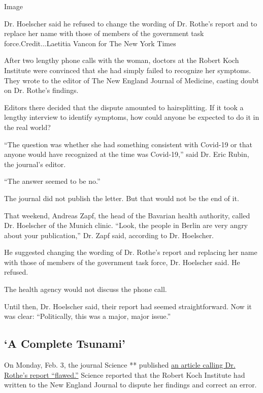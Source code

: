 Image

Dr. Hoelscher said he refused to change the wording of Dr. Rothe's
report and to replace her name with those of members of the government
task force.Credit...Laetitia Vancon for The New York Times

After two lengthy phone calls with the woman, doctors at the Robert Koch
Institute were convinced that she had simply failed to recognize her
symptoms. They wrote to the editor of The New England Journal of
Medicine, casting doubt on Dr. Rothe's findings.

Editors there decided that the dispute amounted to hairsplitting. If it
took a lengthy interview to identify symptoms, how could anyone be
expected to do it in the real world?

``The question was whether she had something consistent with Covid-19 or
that anyone would have recognized at the time was Covid-19,'' said Dr.
Eric Rubin, the journal's editor.

``The answer seemed to be no.''

The journal did not publish the letter. But that would not be the end of
it.

That weekend, Andreas Zapf, the head of the Bavarian health authority,
called Dr. Hoelscher of the Munich clinic. ``Look, the people in Berlin
are very angry about your publication,'' Dr. Zapf said, according to Dr.
Hoelscher.

He suggested changing the wording of Dr. Rothe's report and replacing
her name with those of members of the government task force, Dr.
Hoelscher said. He refused.

The health agency would not discuss the phone call.

Until then, Dr. Hoelscher said, their report had seemed straightforward.
Now it was clear: ``Politically, this was a major, major issue.''

\hypertarget{a-complete-tsunami}{%
\subsection{`A Complete Tsunami'}\label{a-complete-tsunami}}

On Monday, Feb. 3, the journal Science ** published
\href{https://www.sciencemag.org/news/2020/02/paper-non-symptomatic-patient-transmitting-coronavirus-wrong}{an
article calling Dr. Rothe's report ``flawed.''} Science reported that
the Robert Koch Institute had written to the New England Journal to
dispute her findings and correct an error.

